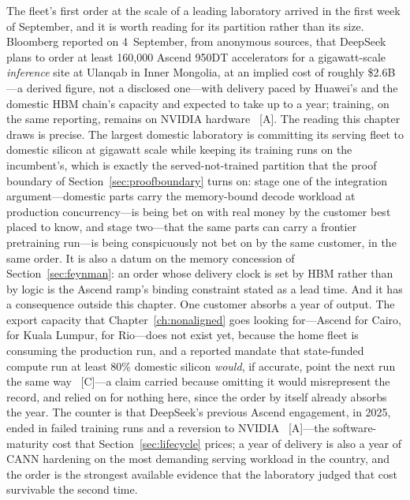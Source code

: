 The fleet's first order at the scale of a leading laboratory arrived in the first week of September, and it is worth reading for its partition rather than its size. Bloomberg reported on 4~September, from anonymous sources, that DeepSeek plans to order at least 160{,}000 Ascend 950DT accelerators for a gigawatt-scale \emph{inference} site at Ulanqab in Inner Mongolia, at an implied cost of roughly \$2.6B---a derived figure, not a disclosed one---with delivery paced by Huawei's and the domestic HBM chain's capacity and expected to take up to a year; training, on the same reporting, remains on NVIDIA hardware~\cite{deepseek-ascend-order} [A]. The reading this chapter draws is precise. The largest domestic laboratory is committing its serving fleet to domestic silicon at gigawatt scale while keeping its training runs on the incumbent's, which is exactly the served-not-trained partition that the proof boundary of Section~\ref{sec:proofboundary} turns on: stage one of the integration argument---domestic parts carry the memory-bound decode workload at production concurrency---is being bet on with real money by the customer best placed to know, and stage two---that the same parts can carry a frontier pretraining run---is being conspicuously not bet on by the same customer, in the same order. It is also a datum on the memory concession of Section~\ref{sec:feynman}: an order whose delivery clock is set by HBM rather than by logic is the Ascend ramp's binding constraint stated as a lead time. And it has a consequence outside this chapter. One customer absorbs a year of output. The export capacity that Chapter~\ref{ch:nonaligned} goes looking for---Ascend for Cairo, for Kuala Lumpur, for Rio---does not exist yet, because the home fleet is consuming the production run, and a reported mandate that state-funded compute run at least 80\% domestic silicon \emph{would}, if accurate, point the next run the same way~\cite{ascend-supply-ceiling} [C]---a claim carried because omitting it would misrepresent the record, and relied on for nothing here, since the order by itself already absorbs the year. The counter is that DeepSeek's previous Ascend engagement, in 2025, ended in failed training runs and a reversion to NVIDIA~\cite{ascend-delay} [A]---the software-maturity cost that Section~\ref{sec:lifecycle} prices; a year of delivery is also a year of CANN hardening on the most demanding serving workload in the country, and the order is the strongest available evidence that the laboratory judged that cost survivable the second time.

